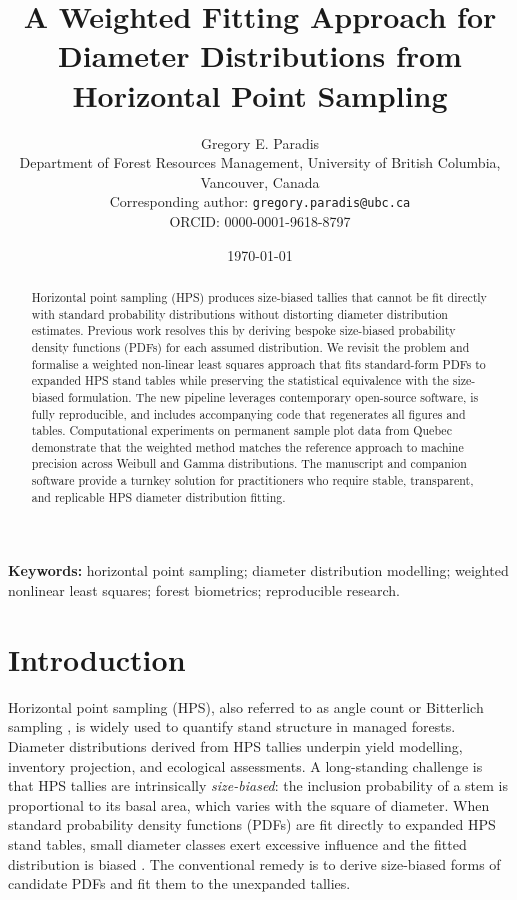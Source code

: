 \documentclass[12pt]{article}
\title{A Weighted Fitting Approach for Diameter Distributions from Horizontal Point Sampling}
\author{Gregory E. Paradis\\Department of Forest Resources Management, University of British Columbia, Vancouver, Canada\\Corresponding author: \texttt{gregory.paradis@ubc.ca}\\ORCID: 0000-0001-9618-8797}
\date{\today}
\begin{document}
\maketitle

\noindent\textbf{Keywords:} horizontal point sampling; diameter distribution modelling; weighted nonlinear least squares; forest biometrics; reproducible research.

\begin{abstract}
Horizontal point sampling (HPS) produces size-biased tallies that cannot be fit
directly with standard probability distributions without distorting diameter
distribution estimates. Previous work resolves this by deriving bespoke
size-biased probability density functions (PDFs) for each assumed distribution.
We revisit the problem and formalise a weighted non-linear least squares
approach that fits standard-form PDFs to expanded HPS stand tables while
preserving the statistical equivalence with the size-biased formulation. The
new pipeline leverages contemporary open-source software, is fully
reproducible, and includes accompanying code that regenerates all figures and
tables. Computational experiments on permanent sample plot data from Quebec
demonstrate that the weighted method matches the reference approach to machine
precision across Weibull and Gamma distributions. The manuscript and companion
software provide a turnkey solution for practitioners who require stable,
transparent, and replicable HPS diameter distribution fitting.
\end{abstract}

\section{Introduction}

Horizontal point sampling (HPS), also referred to as angle count or Bitterlich
sampling \citep{bitterlich1947}, is widely used to quantify stand structure in
managed forests. Diameter distributions derived from HPS tallies underpin yield
modelling, inventory projection, and ecological assessments. A long-standing
challenge is that HPS tallies are intrinsically \emph{size-biased}: the
inclusion probability of a stem is proportional to its basal area, which varies
with the square of diameter. When standard probability density functions (PDFs)
are fit directly to expanded HPS stand tables, small diameter classes exert
excessive influence and the fitted distribution is biased \citep{van1986,
gove2000, ducey2015}. The conventional remedy is to derive size-biased forms of
candidate PDFs and fit them to the unexpanded tallies.
\end{document}
